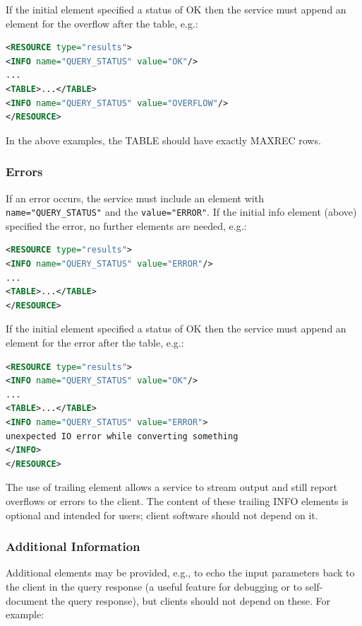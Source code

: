 \documentclass[11pt,letter]{ivoa}
\begin{document}
If the initial  element specified a status of OK then the service must 
append an  element for the overflow after the table, e.g.:

\begin{lstlisting}[language=XML]
<RESOURCE type="results">
<INFO name="QUERY_STATUS" value="OK"/>
...
<TABLE>...</TABLE>
<INFO name="QUERY_STATUS" value="OVERFLOW"/>
</RESOURCE>
\end{lstlisting}

In the above examples, the TABLE should have exactly MAXREC rows.

\subsubsection{Errors}
\label{sect:errors}

If an error occurs, the service must include an  element with 
\verb|name="QUERY_STATUS"| and the \verb|value="ERROR"|. If the initial info element (above) 
specified the error, no further elements are needed, e.g.:

\begin{lstlisting}[language=XML]
<RESOURCE type="results">
<INFO name="QUERY_STATUS" value="ERROR"/>
...
<TABLE>...</TABLE>
</RESOURCE>
\end{lstlisting}

If the initial  element specified a status of OK then the service must 
append an  element for the error after the table, e.g.:

\begin{lstlisting}[language=XML]
<RESOURCE type="results">
<INFO name="QUERY_STATUS" value="OK"/>
...
<TABLE>...</TABLE>
<INFO name="QUERY_STATUS" value="ERROR">
unexpected IO error while converting something
</INFO>
</RESOURCE>
\end{lstlisting}

The use of trailing  element allows a service to stream output and still 
report overflows or errors to the client. The content of these trailing INFO 
elements is optional and intended for users; client software should not depend 
on it.

\subsubsection{Additional Information}
Additional  elements may be provided, e.g., to echo the input parameters 
back to the client in the query response (a useful feature for debugging or to 
self-document the query response), but clients should not depend on these. For 
example:
\end{document}
